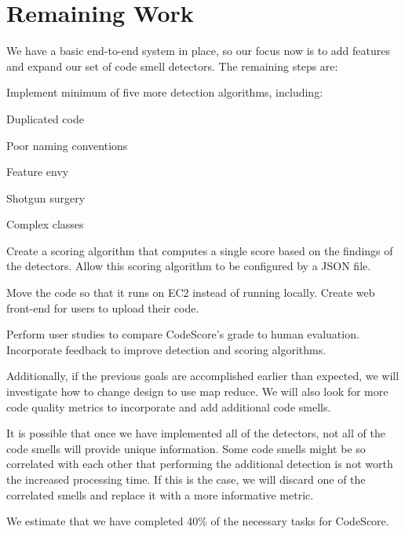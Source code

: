 \documentclass{sig-alternate}
\begin{document}
\section {Remaining Work}
We have a basic end-to-end system in place, so our focus now is to add features and expand our set of code smell detectors. The remaining steps are:
\label{sec:research_timeline}
\begin{itemize*}
	\item Implement  minimum of five more detection algorithms, including:
		\begin{itemize*}
			\item Duplicated code
			\item Poor naming conventions
			\item Feature envy 
			\item Shotgun surgery
			\item Complex classes
		\end{itemize*}
	\item Create a scoring algorithm that computes a single score based on the findings of the detectors. Allow this scoring algorithm to be configured by a JSON file. 
	\item Move the code so that it runs on EC2 instead of running locally. Create web front-end for users to upload their code.
	\item Perform user studies to compare CodeScore's grade to human evaluation. Incorporate feedback to improve detection and scoring algorithms.
\end{itemize*}
Additionally, if the previous goals are accomplished earlier than expected, we will investigate how to change design to use map reduce. We will also look for more code quality metrics to incorporate and add additional code smells. 

It is possible that once we have implemented all of the detectors, not all of
the code smells will provide unique information. Some code smells might be so correlated with each other that
performing the additional detection is not worth the increased processing time.
If this is the case, we will discard one of the correlated smells and replace it
with a more informative metric.

We estimate that we have completed 40\% of the necessary tasks for CodeScore.


\end{document}
